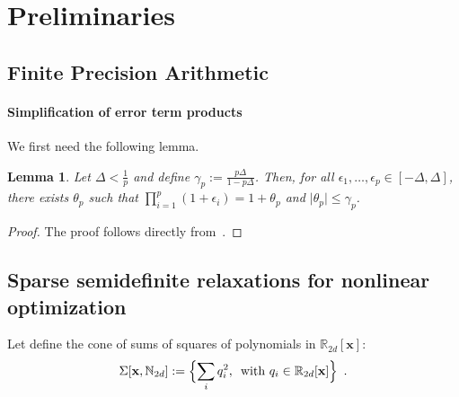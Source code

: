 \documentclass[a4paper,10pt]{article}
\newcommand{\R}{\mathbb{R}}
\newcommand{\N}{\mathbb{N}}
\newcommand{\x}{\mathbf{x}}
\theoremstyle{plain}
\newtheorem{lemma}[theorem]{Lemma}
\theoremstyle{definition}
\theoremstyle{remark}
\begin{document}
\section{Preliminaries}
\label{sec:background}

\subsection{Finite Precision Arithmetic}
\label{sec:fpbackground}

\paragraph{Simplification of error term products}
We first need the following lemma.
\begin{lemma}
\label{th:redproduct}
Let $\Delta < \frac{1}{p}$ and define $\gamma_p := \frac{p \Delta}{1 - p \Delta}$. Then, for all $\epsilon_1, \dots, \epsilon_p \in [-\Delta, \Delta]$, there exists $\theta_p$ such that ${\displaystyle \prod_{i=1}^p (1 + \epsilon_i) = 1 + \theta_p}$ and $\mid \theta_p \mid \leq \gamma_p$.
\end{lemma}
\begin{proof}
The proof follows directly from~\cite[Lemma 3.3]{higham2002accuracy}.
\end{proof}

\subsection{Sparse semidefinite relaxations for nonlinear optimization}
\label{sec:sdpbackground}
Let define the cone of sums of squares of polynomials in $\R_{2 d}[\x]$:
\begin{equation}
\label{eq:cone_sos}
\Sigma [\x, \N_{2d}] := \Bigl\{\sum_i q_i^2, \, \text{ with } q_i \in \R_{2 d}[\x] \Bigr\}\enspace.
\end{equation}
\end{document}
